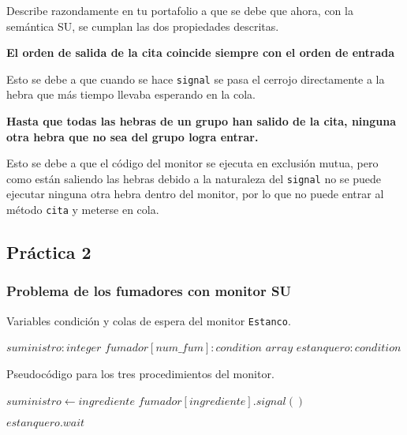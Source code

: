 \documentclass[12pt,a4paper]{article}
\def\code#1{\texttt{#1}}
\begin{document}
Describe razondamente en tu portafolio a que se debe que ahora, con la semántica SU, se cumplan las dos propiedades descritas. 

\textbf{El orden de salida de la cita coincide siempre con el orden de entrada}

Esto se debe a que cuando se hace \code{signal} se pasa el cerrojo directamente a la hebra que más tiempo llevaba esperando en la cola.

\textbf{Hasta que todas las hebras de un grupo han salido de la cita, ninguna otra hebra que no sea del grupo logra entrar.}

Esto se debe a que el código del monitor se ejecuta en exclusión mutua, pero como están saliendo las hebras debido a la naturaleza del \code{signal} no se puede ejecutar ninguna otra hebra dentro del monitor, por lo que no puede entrar al método \code{cita} y meterse en cola.



\subsection{Práctica 2}

\subsubsection{Problema de los fumadores con monitor SU}

Variables condición y colas de espera del monitor \code{Estanco}. 

\begin{algorithmic}[0]
\State $suministro :integer$ 
\State $fumador[num\_fum] : condition$  $array$ 
\State $estanquero : condition$ 

\end{algorithmic}

Pseudocódigo para los tres procedimientos del monitor.

\begin{algorithmic}[0]
 
\State $suministro \gets ingrediente$
\State $fumador[ingrediente].signal()$

\EndProcedure
\end{algorithmic}

\begin{algorithmic}[0]
 
 
\State $estanquero.wait$
\EndIf
\EndProcedure
\end{algorithmic}
\end{document}

